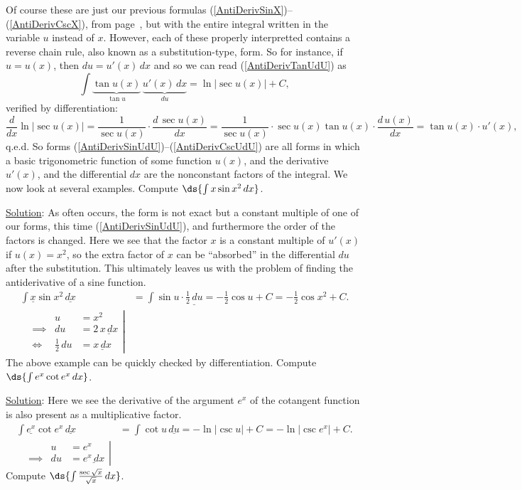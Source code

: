 Of course these are just our previous formulas
(\ref{AntiDerivSinX})--(\ref{AntiDerivCscX}), 
from page~\pageref{AntiDerivSinX}, but with the entire
integral written in the variable $u$
instead of $x$.  However, each of these properly interpretted
contains a reverse chain
rule, also known as a substitution-type, form.  So for instance,
if $u=u(x)$, then $du=u'(x)\,dx$ and so we can read
(\ref{AntiDerivTanUdU}) as
$$\int\underbrace{\tan u(x)}_{\tan u}\,\underbrace{u'(x)\,dx}_{du}=
  \ln|\sec u(x)|+C,$$
verified by differentiation:
$$\frac{d}{dx}\ln|\sec u(x)|
 =\frac1{\sec u(x)}\cdot\frac{d\,\sec u(x)}{dx}
 =\frac1{\sec u(x)}\cdot\sec u(x)\tan u(x)\cdot\frac{d\,u(x)}{dx}
 =\tan u(x)\cdot u'(x),$$
q.e.d.  So forms (\ref{AntiDerivSinUdU})--(\ref{AntiDerivCscUdU}) are all
forms in which a basic trigonometric function of some function
$u(x)$, and the derivative $u'(x)$, and the differential $dx$
are the nonconstant factors of the integral.  We now look at several
examples.
\bex Compute $\ds{\int x\sin x^2\,dx}$.

\underline{Solution}: As often occurs, the form is not exact but
a constant multiple of one of our forms, this time (\ref{AntiDerivSinUdU}),
and furthermore the order of the factors is changed.  Here
we see that the factor $x$ is a constant multiple of $u'(x)$ if
$u(x)=x^2$, so the extra factor of $x$ can be ``absorbed'' in the 
differential $du$ after the substitution.  This ultimately leaves
us with the problem of finding the antiderivative of a sine function.
\begin{align*}
\int \underline{x}\sin x^2\,\underline{dx}&=
      \int \sin u\cdot\underline{\frac12\,du}
  =-\frac12\cos u+C=-\frac12\cos x^2+C.\\
\left.\begin{alignedat}{2}
&&u&=x^2\\
&\implies &du&=2\,\underline{x\,dx}\\
&\iff&\frac12\,du&=\underline{x\,dx}\end{alignedat}\right|&\end{align*}
\eex
The above example can be quickly checked by differentiation.
\bex Compute $\ds{\int e^x\cot e^x\,dx}$.

\underline{Solution}:  Here we see the derivative of the argument
$e^x$ of the cotangent function is also present as a multiplicative 
factor.
\begin{align*}
\int \underline{e^x}\cot e^x\,\underline{dx}&=
      \int \cot u\,\underline{du}
  =-\ln|\csc u|+C=-\ln\left|\csc e^x\right|+C.\\
\left.\begin{alignedat}{2}
&&u&=e^x\\
&\implies &du&=\underline{e^x\,dx}\end{alignedat}
\right|&\end{align*}
\eex
\bex Compute $\ds{\int\frac{\sec\sqrt{x}}{\sqrt x}\,dx}$.

